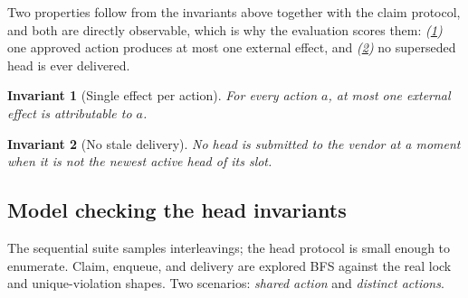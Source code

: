 \documentclass[acmsmall,manuscript,review,anonymous]{acmart}
\renewcommand{\_}{\discretionary{\textunderscore}{}{\textunderscore}}
\newtheorem{invariant}{Invariant}
\begin{document}
Two properties follow from the invariants above together with the claim
protocol, and both are directly observable, which is why the evaluation scores
them: \emph{(\ref{inv:effect})} one approved action produces at most one
external effect, and \emph{(\ref{inv:stale})} no superseded head is ever
delivered.

\begin{invariant}[Single effect per action]
\label{inv:effect}
For every action $a$, at most one external effect is attributable to $a$.
\end{invariant}

\begin{invariant}[No stale delivery]
\label{inv:stale}
No head is submitted to the vendor at a moment when it is not the newest active
head of its slot.
\end{invariant}

\subsection{Model checking the head invariants}
\label{sec:inv-model}

The sequential suite samples interleavings; the head protocol is small
enough to enumerate. Claim, enqueue, and delivery are explored BFS
against the real lock and unique-violation shapes. Two scenarios:
\emph{shared action} and \emph{distinct actions}.
\end{document}
